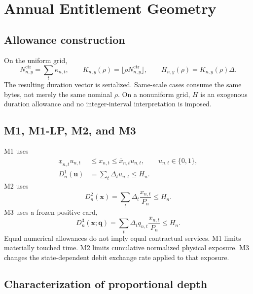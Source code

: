 \documentclass[10pt,journal,onecolumn]{IEEEtran}
\begin{document}
\section{Annual Entitlement Geometry}
\label{sec:report_geometry}

\subsection{Allowance construction}

On the uniform grid,
\begin{equation}
N_{n,y}^{\mathrm{ctr}}=\sum_t\kappa_{n,t},
\qquad
K_{n,y}(\rho)=\lfloor\rho N_{n,y}^{\mathrm{ctr}}\rfloor,
\qquad
H_{n,y}(\rho)=K_{n,y}(\rho)\Delta.
\label{eq:report_allowance}
\end{equation}
The resulting duration vector is serialized. Same-scale cases consume the
same bytes, not merely the same nominal $\rho$. On a nonuniform grid, $H$ is
an exogenous duration allowance and no integer-interval interpretation is
imposed.

\subsection{M1, M1-LP, M2, and M3}

M1 uses
\begin{align}
\underline x_{n,t}u_{n,t}
&\leq x_{n,t}\leq\bar x_{n,t}u_{n,t},
\qquad u_{n,t}\in\{0,1\},
\label{eq:report_m1_links}\\
D_n^1(\bm u)
&=\sum_t\Delta_tu_{n,t}\leq H_n.
\label{eq:report_m1}
\end{align}
M2 uses
\begin{equation}
D_n^2(\bm x)=\sum_t\Delta_t\frac{x_{n,t}}{P_n}\leq H_n.
\label{eq:report_m2}
\end{equation}
M3 uses a frozen positive card,
\begin{equation}
D_n^3(\bm x;\bm q)
=\sum_t\Delta_tq_{n,t}\frac{x_{n,t}}{P_n}\leq H_n.
\label{eq:report_m3}
\end{equation}
Equal numerical allowances do not imply equal contractual services. M1 limits
materially touched time. M2 limits cumulative normalized physical exposure.
M3 changes the state-dependent debit exchange rate applied to that exposure.

\subsection{Characterization of proportional depth}
\end{document}
